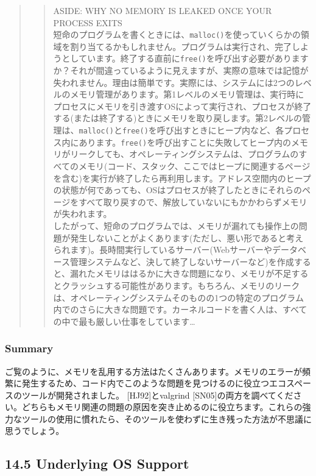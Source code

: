 \begin{quote}
\begin{quote}
ASIDE: WHY NO MEMORY IS LEAKED ONCE YOUR PROCESS EXITS\\
短命のプログラムを書くときには、\texttt{malloc()}を使っていくらかの領域を割り当てるかもしれません。プログラムは実行され、完了しようとしています。終了する直前に\texttt{free()}を呼び出す必要がありますか？それが間違っているように見えますが、実際の意味では記憶が失われません。理由は簡単です。実際には、システムには2つのレベルのメモリ管理があります。第1レベルのメモリ管理は、実行時にプロセスにメモリを引き渡すOSによって実行され、プロセスが終了する(または終了する)ときにメモリを取り戻します。第2レベルの管理は、\texttt{malloc()}と\texttt{free()}を呼び出すときにヒープ内など、各プロセス内にあります。\texttt{free()}を呼び出すことに失敗してヒープ内のメモリがリークしても、オペレーティングシステムは、プログラムのすべてのメモリ(コード、スタック、ここではヒープに関連するページを含む)を実行が終了したら再利用します。アドレス空間内のヒープの状態が何であっても、OSはプロセスが終了したときにそれらのページをすべて取り戻すので、解放していないにもかかわらずメモリが失われます。\\
したがって、短命のプログラムでは、メモリが漏れても操作上の問題が発生しないことがよくあります(ただし、悪い形であると考えられます)。長時間実行しているサーバー(Webサーバーやデータベース管理システムなど、決して終了しないサーバーなど)を作成すると、漏れたメモリははるかに大きな問題になり、メモリが不足するとクラッシュする可能性があります。もちろん、メモリのリークは、オペレーティングシステムそのものの1つの特定のプログラム内でのさらに大きな問題です。カーネルコードを書く人は、すべての中で最も厳しい仕事をしています\ldots{}
\end{quote}
\end{quote}

\hypertarget{summary-6}{%
\subsubsection*{Summary}\label{summary-6}}

ご覧のように、メモリを乱用する方法はたくさんあります。メモリのエラーが頻繁に発生するため、コード内でこのような問題を見つけるのに役立つエコスペースのツールが開発されました。
{[}HJ92{]}とvalgrind
{[}SN05{]}の両方を調べてください。どちらもメモリ関連の問題の原因を突き止めるのに役立ちます。これらの強力なツールの使用に慣れたら、そのツールを使わずに生き残った方法が不思議に思うでしょう。

\hypertarget{underlying-os-support}{%
\subsection*{14.5 Underlying OS Support}\label{underlying-os-support}}

